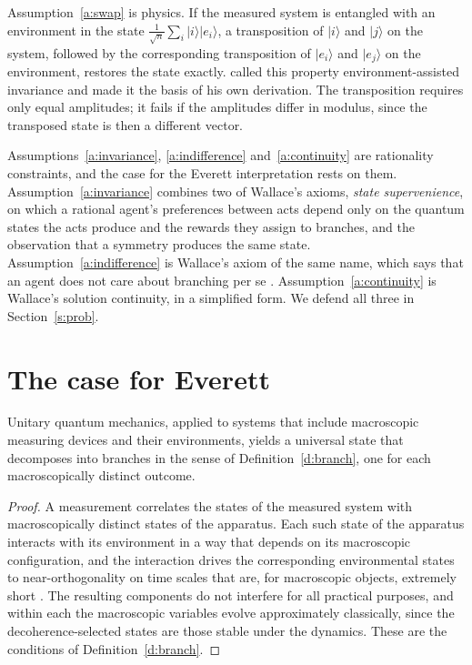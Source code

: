 \documentclass{situationist-preprint}
\begin{document}
Assumption~\ref{a:swap} is physics. If the measured system is entangled with an environment in the state $\frac{1}{\sqrt{n}}\sum_i \lvert i\rangle\lvert e_i\rangle$, a transposition of $\lvert i\rangle$ and $\lvert j\rangle$ on the system, followed by the corresponding transposition of $\lvert e_i\rangle$ and $\lvert e_j\rangle$ on the environment, restores the state exactly. \citet{Zurek2005} called this property environment-assisted invariance and made it the basis of his own derivation. The transposition requires only equal amplitudes; it fails if the amplitudes differ in modulus, since the transposed state is then a different vector.

Assumptions~\ref{a:invariance}, \ref{a:indifference} and~\ref{a:continuity} are rationality constraints, and the case for the Everett interpretation rests on them. Assumption~\ref{a:invariance} combines two of Wallace's axioms, \emph{state supervenience}, on which a rational agent's preferences between acts depend only on the quantum states the acts produce and the rewards they assign to branches, and the observation that a symmetry produces the same state. Assumption~\ref{a:indifference} is Wallace's axiom of the same name, which says that an agent does not care about branching per se \citep{Wallace2012}. Assumption~\ref{a:continuity} is Wallace's solution continuity, in a simplified form. We defend all three in Section~\ref{s:prob}.

\section{The case for Everett}\label{s:everett}

\begin{lemma}\label{l:emergence}
Unitary quantum mechanics, applied to systems that include macroscopic measuring devices and their environments, yields a universal state that decomposes into branches in the sense of Definition~\ref{d:branch}, one for each macroscopically distinct outcome.
\end{lemma}

\begin{proof}
A measurement correlates the states of the measured system with macroscopically distinct states of the apparatus. Each such state of the apparatus interacts with its environment in a way that depends on its macroscopic configuration, and the interaction drives the corresponding environmental states to near-orthogonality on time scales that are, for macroscopic objects, extremely short \citep{Zurek2003}. The resulting components do not interfere for all practical purposes, and within each the macroscopic variables evolve approximately classically, since the decoherence-selected states are those stable under the dynamics. These are the conditions of Definition~\ref{d:branch}.
\end{proof}
\end{document}
